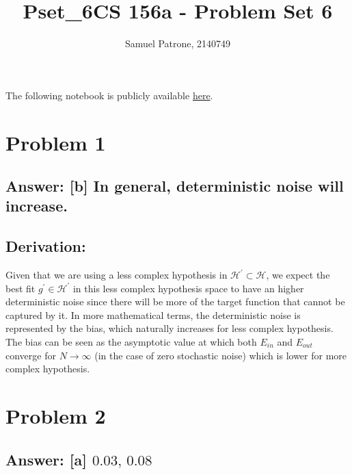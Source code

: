 \documentclass[11pt]{article}
\title{Pset\_6}
\begin{document}
    \title{CS 156a - Problem Set 6}
    \author{Samuel Patrone, 2140749}
    \maketitle
    

The following notebook is publicly available
\href{https://github.com/spatrone/CS156A-Caltech.git}{here}.

\tableofcontents

    \hypertarget{problem-1}{%
\section{Problem 1}\label{problem-1}}

\hypertarget{answer-b-in-general-deterministic-noise-will-increase.}{%
\subsection{Answer: {[}b{]} In general, deterministic noise will
increase.}\label{answer-b-in-general-deterministic-noise-will-increase.}}

\hypertarget{derivation}{%
\subsection{Derivation:}\label{derivation}}

Given that we are using a less complex hypothesis in
\(\mathcal{H}^\prime\subset\mathcal{H}\), we expect the best fit
\(g^\prime\in\mathcal{H}^\prime\) in this less complex hypothesis space
to have an higher deterministic noise since there will be more of the
target function that cannot be captured by it. In more mathematical
terms, the deterministic noise is represented by the bias, which
naturally increases for less complex hypothesis. The bias can be seen as
the asymptotic value at which both \(E_{in}\) and \(E_{out}\) converge
for \(N\to\infty\) (in the case of zero stochastic noise) which is lower
for more complex hypothesis.

    \hypertarget{problem-2}{%
\section{Problem 2}\label{problem-2}}

\hypertarget{answer-a-0.030.08}{%
\subsection{\texorpdfstring{Answer: {[}a{]}
\(0.03,\,0.08\)}{Answer: {[}a{]} 0.03,\textbackslash{},0.08}}\label{answer-a-0.030.08}}
\end{document}
